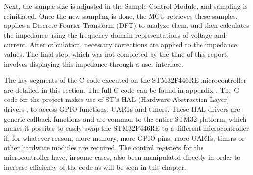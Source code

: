 Next, the sample size is adjusted in the Sample Control Module, and sampling is reinitiated. Once the new sampling is done, the MCU retrieves these samples, applies a Discrete Fourier Transform (DFT) to analyze them, and then calculates the impedance using the frequency-domain representations of voltage and current. After calculation, necessary corrections are applied to the impedance values. The final step, which was not completed by the time of this report, involves displaying this impedance through a user interface.

The key segments of the C code executed on the STM32F446RE microcontroller are detailed in this section. The full C code can be found in appendix . The C code for the project makes use of ST's HAL (Hardware Abstraction Layer) drivers \cite{STHAL}, to access GPIO functions, UARTs and timers. These HAL drivers are generic callback functions and are common to the entire STM32 platform, which makes it possible to easily swap the STM32F446RE to a different microcontroller if, for whatever reason, more memory, more GPIO pins, more UARTs, timers or other hardware modules are required. The control registers for the microcontroller have, in some cases, also been manipulated directly in order to increase efficiency of the code as will be seen in this chapter. 





